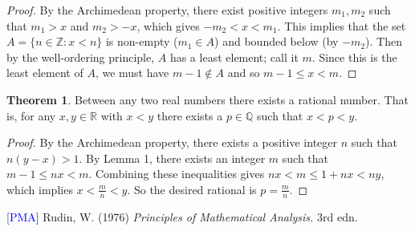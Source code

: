 \documentclass[12pt]{article}
\theoremstyle{definition}
\newtheorem{theorem}{Theorem}
\begin{document}
\begin{proof}

By the Archimedean property, there exist positive integers \( m_1, m_2 \) such that \( m_1 > x \) and \( m_2 > - x \), which gives \( -m_2 < x < m_1 \). This implies that the set \( A = \{ n \in \mathbb{Z} : x < n \} \) is non-empty (\( m_1 \in A \)) and bounded below (by \( -m_2 \)). Then by the well-ordering principle, \( A \) has a least element; call it \( m \). Since this is the least element of \( A \), we must have \( m - 1 \not\in A \) and so \( m - 1 \leq x < m \).
\end{proof}

\begin{theorem}

Between any two real numbers there exists a rational number. That is, for any \( x, y \in \mathbb{R} \) with \( x < y \) there exists a \( p \in \mathbb{Q} \) such that \( x < p < y \).

\end{theorem}

\begin{proof}

By the Archimedean property, there exists a positive integer \( n \) such that \( n(y - x) > 1 \). By Lemma 1, there exists an integer \( m \) such that \( m - 1 \leq nx < m \). Combining these inequalities gives \( nx < m \leq 1 + nx < ny \), which implies \( x < \frac{m}{n} < y \). So the desired rational is \( p = \frac{m}{n} \).
\end{proof}

\hrulefill

\hypertarget{pma}{\textcolor{blue}{[PMA]} Rudin, W. (1976) \textit{Principles of Mathematical Analysis.} 3rd edn.}
\end{document}
